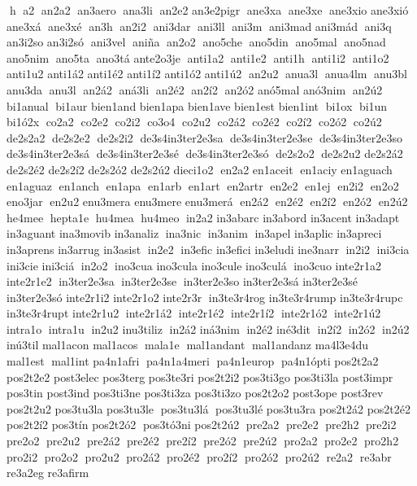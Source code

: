 h  a2  an2a2  an3aero  ana3li  an2e2 
 an3e2pigr  ane3xa  ane3xe  ane3xio 	 ane3xió  ane3xá  ane3xé  an3h  an2i2  ani3dar  ani3ll  ani3m  ani3mad 	 ani3mád  ani3q  an3i2so 	 an3i2só  ani3vel  aniña  an2o2  ano5che  ano5din  ano5mal  ano5nad  ano5nim  ano5ta  ano3tá 
 ante2o3je  anti1a2  anti1e2  anti1h  anti1i2  anti1o2  anti1u2 	 anti1á2 	 anti1é2 	 anti1í2 	 anti1ó2 	 anti1ú2  an2u2  anua3l  anua4lm  anu3bl  anu3da  anu3l  an2á2  aná3li  an2é2  an2í2  an2ó2 	 anó5mal 	 anó3nim  an2ú2  	 bi1anual  bi1aur 	 bien1and 	 bien1apa 	 bien1ave 	 bien1est 	 bien1int  bi1ox  bi1un  bi1ó2x  co2a2  co2e2  co2i2  co3o4  co2u2  co2á2  co2é2  co2í2  co2ó2  co2ú2  de2s2a2  de2s2e2  de2s2i2  de3s4in3ter2e3sa  de3s4in3ter2e3se  de3s4in3ter2e3so  de3s4in3ter2e3sá  de3s4in3ter2e3sé  de3s4in3ter2e3só  de2s2o2  de2s2u2 	 de2s2á2 	 de2s2é2 	 de2s2í2 	 de2s2ó2 	 de2s2ú2 	 dieci1o2  en2a2 	 en1aceit  en1aciy 
 en1aguach 	 en1aguaz  en1anch  en1apa  en1arb  en1art  en2artr  en2e2  en1ej  en2i2  en2o2  eno3jar  en2u2 	 enu3mera 	 enu3mere 
 enu3merá  en2á2  en2é2  en2í2  en2ó2  en2ú2  he4mee  hepta1e  hu4mea  hu4meo  in2a2 	 in3abarc 	 in3abord 	 in3acent 	 in3adapt 
 in3aguant 
 ina3movib 
 in3analiz  ina3nic  in3anim  in3apel 	 in3aplic 
 in3apreci 
 in3aprens 	 in3arrug 	 in3asist  in2e2  in3efic 	 in3efici 	 in3eludi 	 ine3narr  in2i2  ini3cia  ini3cie 	 ini3ciá  in2o2  ino3cua 	 ino3cula 	 ino3cule 
 ino3culá  ino3cuo 
 inte2r1a2 
 inte2r1e2  in3ter2e3sa  in3ter2e3se  in3ter2e3so 
 in3ter2e3sá 
 in3ter2e3sé 
 in3ter2e3só 
 inte2r1i2 
 inte2r1o2 	 inte2r3r  in3te3r4rog 
 in3te3r4rump 
 in3te3r4rupc 
 in3te3r4rupt 
 inte2r1u2  inte2r1á2  inte2r1é2  inte2r1í2  inte2r1ó2  inte2r1ú2  intra1o  intra1u  in2u2 
 inu3tiliz  in2á2 	 iná3nim  in2é2 	 iné3dit  in2í2  in2ó2  in2ú2 	 inú3til 	 mal1acon 	 mal1acos  mala1e  mal1andant  mal1andanz 
 ma4l3e4du  mal1est  mal1int 
 pa4n1afri  pa4n1a4meri  pa4n1europ  pa4n1ópti 	 pos2t2a2 	 pos2t2e2 
 post3elec 	 pos3terg 
 pos3te3ri 	 pos2t2i2 
 pos3ti3go 
 pos3ti3la 
 post3impr  pos3tin 	 post3ind 
 pos3ti3ne 
 pos3ti3za 
 pos3ti3zo 	 pos2t2o2 	 post3ope 	 post3rev 	 pos2t2u2 
 pos3tu3la 
 pos3tu3le  pos3tu3lá  pos3tu3lé 
 pos3tu3ra 
 pos2t2á2 
 pos2t2é2 
 pos2t2í2 	 pos3tín 
 pos2t2ó2  pos3tó3ni 
 pos2t2ú2  pre2a2  pre2e2  pre2h2  pre2i2  pre2o2  pre2u2  pre2á2  pre2é2  pre2í2  pre2ó2  pre2ú2  pro2a2  pro2e2  pro2h2  pro2i2  pro2o2  pro2u2  pro2á2  pro2é2  pro2í2  pro2ó2  pro2ú2  re2a2  re3abr  re3a2eg 	 re3afirm 
